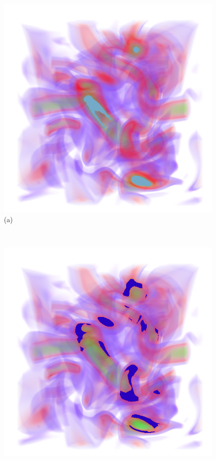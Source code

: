 \documentclass[twoside,twocolumn,10pt]{article}
\begin{document}
\begin{figure}
	\centering
	\begin{minipage}{.16\textwidth}
		\centering
		\includegraphics[width=1\linewidth]{crop/vortex_segment_green}
		(a)
	\end{minipage}~
	\begin{minipage}{.16\textwidth}
		\centering
		\includegraphics[width=1\linewidth]{crop/vortex_segment_red}

\end{minipage}
\end{figure}
\end{document}
